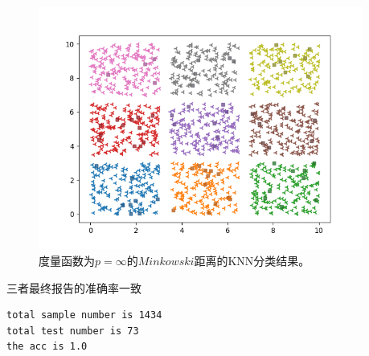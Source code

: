 \documentclass{article}
\begin{document}
 \begin{figure}[H]
    \centering
    \begin{minipage}[t]{1.0\linewidth}
        \centering
        \includegraphics[height=8cm]{inf1.png}
        \caption{度量函数为$p=\infty$的$Minkowski$距离的KNN分类结果。}
    \end{minipage}
 \end{figure}
 三者最终报告的准确率一致
 \begin{verbatim}
total sample number is 1434
total test number is 73
the acc is 1.0
\end{verbatim}
\end{document}
